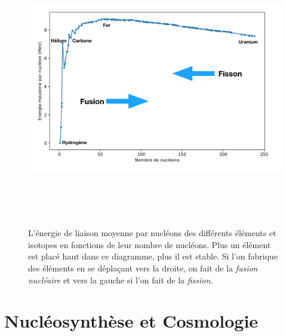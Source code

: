 \begin{figure}[htbp]
	\centering
		\includegraphics[height=12cm]{figs/binding.png}
	\caption[Énergies de liaisons des différents éléments]{L'énergie de liaison moyenne par nucléons des différents éléments et isotopes en fonctions de leur nombre de nucléons. Plus un élément est placé haut dans ce diagramme, plus il est stable. Si l'on fabrique des éléments en se déplaçant vers la droite, on fait de la \textit{fusion nucléaire} et vers la gauche si l'on fait de la \textit{fission}.}
	\label{f:binding}
\end{figure}

\section{Nucléosynthèse et Cosmologie}

